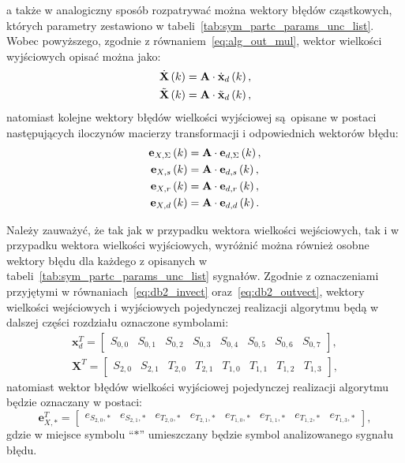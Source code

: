 a także w analogiczny sposób rozpatrywać można wektory błędów cząstkowych, których parametry zestawiono w tabeli~\ref{tab:sym_partc_params_unc_list}. Wobec powyższego, zgodnie z równaniem~\eqref{eq:alg_out_mul}, wektor wielkości wyjściowych opisać można jako:
\begin{gather}
\dot{\mathbf{X}} \left(k\right) = \mathbf{A} \cdot \dot{\mathbf{x}}_{d} \left(k\right) \label{eq:sym_partd_output_ideal}, \\
\tilde{\mathbf{X}} \left(k\right) = \mathbf{A} \cdot \tilde{\mathbf{x}}_{d} \left(k\right) \label{eq:sym_partd_output_real},
\end{gather}
natomiast kolejne wektory błędów wielkości wyjściowej są opisane w postaci następujących iloczynów macierzy transformacji i odpowiednich wektorów błędu:
\begin{gather}
\mathbf{e}_{X,\Sigma} \left(k\right) = \mathbf{A} \cdot \mathbf{e}_{d,\Sigma} \left(k\right) \label{eq:sym_partd_output_error_sum}, \\
\mathbf{e}_{X,s} \left(k\right) = \mathbf{A} \cdot \mathbf{e}_{d,s} \left(k\right) \label{eq:sym_partd_output_error_stat}, \\
\mathbf{e}_{X,r} \left(k\right) = \mathbf{A} \cdot \mathbf{e}_{d,r} \left(k\right) \label{eq:sym_partd_output_error_rand}, \\
\mathbf{e}_{X,d} \left(k\right) = \mathbf{A} \cdot \mathbf{e}_{d,d} \left(k\right) \label{eq:sym_partd_output_error_dyn}.
\end{gather}

Należy zauważyć, że tak jak w przypadku wektora wielkości wejściowych, tak i w przypadku wektora wielkości wyjściowych, wyróżnić można również osobne wektory błędu dla każdego z opisanych w tabeli~\ref{tab:sym_partc_params_unc_list} sygnałów. Zgodnie z oznaczeniami przyjętymi w równaniach~\eqref{eq:db2_invect} oraz~\eqref{eq:db2_outvect}, wektory wielkości wejściowych i wyjściowych pojedynczej realizacji algorytmu będą w dalszej części rozdziału oznaczone symbolami:
\begin{gather}
\mathbf{x}_{d}^{T} =
\begin{bmatrix}
S_{0,0} & S_{0,1} & S_{0,2} & S_{0,3} & S_{0,4} & S_{0,5} & S_{0,6} & S_{0,7}
\end{bmatrix}
\label{eq:sym_partd_invect}, \\
\mathbf{X}^{T} =
\begin{bmatrix}
S_{2,0} & S_{2,1} & T_{2,0} & T_{2,1} & T_{1,0} & T_{1,1} & T_{1,2} & T_{1,3}
\end{bmatrix}
\label{eq:sym_partd_outvect},
\end{gather}
natomiast wektor błędów wielkości wyjściowej pojedynczej realizacji algorytmu będzie oznaczany w postaci:
\begin{equation}
\mathbf{e}_{X,*}^{T} =
\begin{bmatrix}
e_{S_{2,0},*} & e_{S_{2,1},*} & e_{T_{2,0},*} & e_{T_{2,1},*} & e_{T_{1,0},*} & e_{T_{1,1},*} & e_{T_{1,2},*} & e_{T_{1,3},*}
\end{bmatrix}
\label{eq:sym_partd_errvect},
\end{equation}
gdzie w miejsce symbolu \enquote{$*$} umieszczany będzie symbol analizowanego sygnału błędu.

